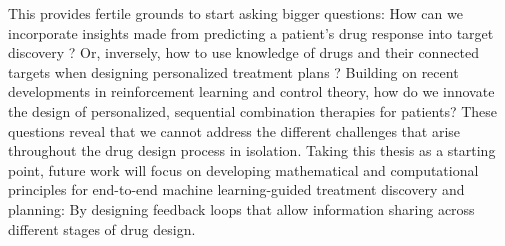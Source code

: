 This provides fertile grounds to start asking bigger questions: How can we incorporate insights made from predicting a patient's drug response into target discovery \citep{huang2022artificial}? Or, inversely, how to use knowledge of drugs and their connected targets when designing personalized treatment plans \citep{nilforoshan2023zero}? Building on recent developments in reinforcement learning and control theory, how do we innovate the design of personalized, sequential combination therapies for patients?
These questions reveal that we cannot address the different challenges that arise throughout the drug design process in isolation.
Taking this thesis as a starting point, future work will focus on developing mathematical and computational principles for end-to-end machine learning-guided treatment discovery and planning:
By designing feedback loops that allow information sharing across different stages of drug design.


